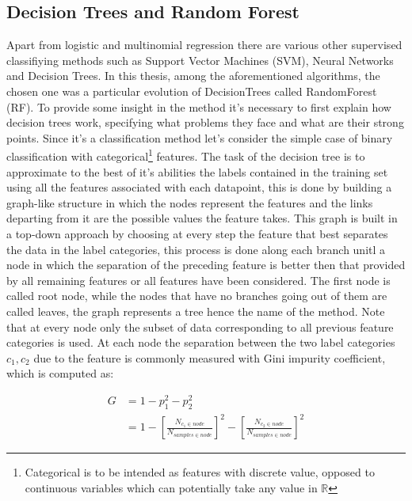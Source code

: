 \subsection{Decision Trees and Random Forest}
Apart from logistic and multinomial regression there are various other supervised classifiying methods such as Support Vector Machines (SVM), Neural Networks and Decision Trees. In this thesis, among the aforementioned algorithms, the chosen one was a particular evolution of DecisionTrees called RandomForest (RF).
To provide some insight in the method it's necessary to first explain how decision trees work, specifying what problems they face and what are their strong points.
Since it's a classification method let's consider the simple case of binary classification with categorical\footnote{Categorical is to be intended as features with discrete value, opposed to continuous variables which can potentially take any value in $\mathbb{R}$} features. The task of the decision tree is to approximate to the best of it's abilities the labels contained in the training set using all the features associated with each datapoint, this is done by building a graph-like structure in which the nodes represent the features and the links departing from it are the possible values the feature takes. This graph is built in a top-down approach by choosing at every step the feature that best separates the data in the label categories, this process is done along each branch unitl a node in which the separation of the preceding feature is better then that provided by all remaining features or all features have been considered. The first node is called root node, while the nodes that have no branches going out of them are called leaves, the graph represents a tree hence the name of the method. Note that at every node only the subset of data corresponding to all previous feature categories is used.
At each node the separation between the two label categories $c_1, c_2$ due to the feature is commonly measured with Gini impurity coefficient, which is computed as:

\begin{equation}
	\begin{split}
		G &= 1 - p^2_1 -p^2_2 \\
		   &= 1 - \left[ \frac{N_{c_1\in node}}{N_{samples\in node} } \right]^2 - \left[\frac{N_{c_2\in node}}{N_{samples\in node}} \right]^2
	\end{split}
\end{equation}

